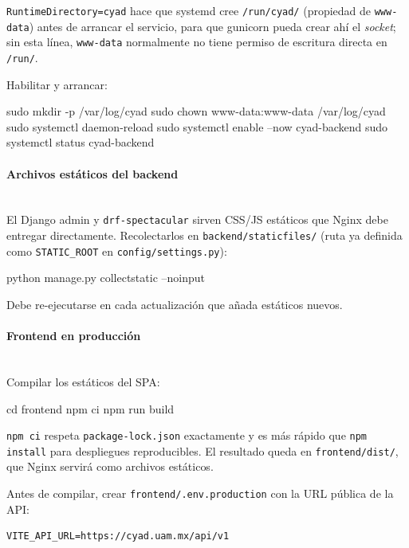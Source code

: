 \texttt{RuntimeDirectory=cyad} hace que systemd cree \texttt{/run/cyad/} (propiedad de \texttt{www-data}) antes de arrancar el servicio, para que gunicorn pueda crear ahí el \emph{socket}; sin esta línea, \texttt{www-data} normalmente no tiene permiso de escritura directa en \texttt{/run/}.

Habilitar y arrancar:

\begin{Comandos}
sudo mkdir -p /var/log/cyad
sudo chown www-data:www-data /var/log/cyad
sudo systemctl daemon-reload
sudo systemctl enable --now cyad-backend
sudo systemctl status cyad-backend
\end{Comandos}

\paragraph{Archivos estáticos del backend}\mbox{}\\
El Django admin y \texttt{drf-spectacular} sirven CSS/JS estáticos que Nginx debe entregar directamente. Recolectarlos en \texttt{backend/staticfiles/} (ruta ya definida como \texttt{STATIC\_ROOT} en \texttt{config/settings.py}):

\begin{Comandos}
python manage.py collectstatic --noinput
\end{Comandos}

Debe re-ejecutarse en cada actualización que añada estáticos nuevos.

\paragraph{Frontend en producción}\mbox{}\\
Compilar los estáticos del SPA:

\begin{Comandos}
cd frontend
npm ci
npm run build
\end{Comandos}

\texttt{npm ci} respeta \texttt{package-lock.json} exactamente y es más rápido que \texttt{npm install} para despliegues reproducibles. El resultado queda en \texttt{frontend/dist/}, que Nginx servirá como archivos estáticos.

Antes de compilar, crear \texttt{frontend/.env.production} con la URL pública de la API:

\begin{lstlisting}[language=DotEnv,style=mystyle-sn]
VITE_API_URL=https://cyad.uam.mx/api/v1
\end{lstlisting}

